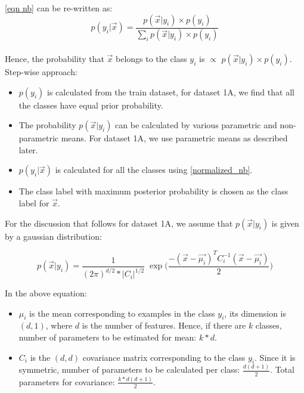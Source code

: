 \documentclass[11pt,a4paper]{article}
\newcommand{\noi}{\noindent}
\begin{document}
\noi
\autoref{eqn nb} can be re-written as:
\begin{equation} \label{normalized_nb}
    p(y_{i}|\vec{x})=\frac{p(\vec{x}|y_{i}) \times p(y_{i})}{\sum_{i}p(\vec{x}|y_{i}) \times p(y_{i})}
\end{equation}\\

\noi
Hence, the probability that $\vec{x}$ belongs to the class $y_{i}$ is $\propto$ $p(\vec{x}|y_{i}) \times p(y_{i})$.\\

\noi
Step-wise approach:
\begin{itemize}
    \itemsep0em
    \item $p(y_{i})$ is calculated from the train dataset, for dataset 1A, we find that all the classes have equal prior probability.
    \item The probability $p(\vec{x}|y_{i})$ can be calculated by various parametric and non-parametric means. For dataset 1A, we use parametric means as described later.
    \item $p(y_{i}|\vec{x})$ is calculated for all the classes using \autoref{normalized_nb}.
    \item The class label with maximum posterior probability is chosen as the class label for $\vec{x}$.
\end{itemize}

\noi
For the discussion that follows for dataset 1A, we assume that $p(\vec{x}|y_{i})$ is given by a gaussian distribution:

\begin{equation}
\label{gaussian}
    p(\vec{x}|y_{i})=\frac{1}{(2\pi)^{d/2}*|C_{i}|^{1/2}}\;\exp{\Big(\frac{-(\vec{x}-\vec{\mu_{i}})^{T}C_{i}^{-1}(\vec{x}-\vec{\mu_{i}})}{2}}\Big)
\end{equation}

\noi
In the above equation: 

\begin{itemize}
    \item $\mu_{i}$ is the mean corresponding to examples in the class $y_{i}$, its dimension is $(d,1)$, where $d$ is the number of features. Hence, if there are $k$ classes, number of parameters to be estimated for mean: $k*d$.
    \item $C_{i}$ is the $(d,d)$ covariance matrix corresponding to the class $y_{i}$. Since it is symmetric, number of parameters to be calculated per class: $\frac{d(d+1)}{2}$. Total parameters for covariance: $\frac{k*d(d+1)}{2}$.
\end{itemize}
\end{document}
